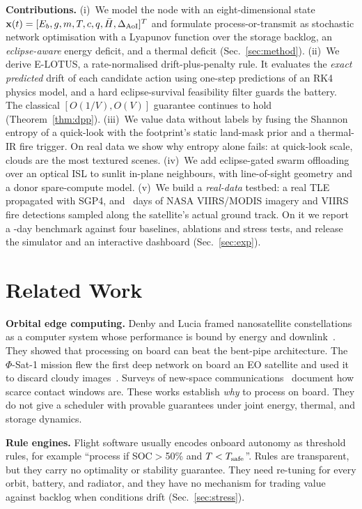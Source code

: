 \documentclass[conference]{IEEEtran}
\theoremstyle{remark}
\begin{document}
\textbf{Contributions.}
(i)~We model the node with an eight-dimensional state
$\mathbf{x}(t)=[E_b,g,m,T,c,q,\bar H,\Delta_{\rm AoI}]^T$
and formulate process-or-transmit as stochastic network optimisation with a Lyapunov function over the storage backlog, an \emph{eclipse-aware} energy deficit, and a thermal deficit (Sec.~\ref{sec:method}).
(ii)~We derive E-LOTUS, a rate-normalised drift-plus-penalty rule. It evaluates the \emph{exact predicted} drift of each candidate action using one-step predictions of an RK4 physics model, and a hard eclipse-survival feasibility filter guards the battery. The classical $[O(1/V),O(V)]$ guarantee continues to hold (Theorem~\ref{thm:dpp}).
(iii)~We value data without labels by fusing the Shannon entropy of a quick-look with the footprint's static land-mask prior and a thermal-IR fire trigger. On real data we show why entropy alone fails: at quick-look scale, clouds are the most textured scenes.
(iv)~We add eclipse-gated swarm offloading over an optical ISL to sunlit in-plane neighbours, with line-of-sight geometry and a donor spare-compute model.
(v)~We build a \emph{real-data} testbed: a real TLE propagated with SGP4, and \Days\ days of NASA VIIRS/MODIS imagery and VIIRS fire detections sampled along the satellite's actual ground track. On it we report a \Days-day benchmark against four baselines, ablations and stress tests, and release the simulator and an interactive dashboard (Sec.~\ref{sec:exp}).

\section{Related Work}
\textbf{Orbital edge computing.} Denby and Lucia framed nanosatellite constellations as a computer system whose performance is bound by energy and downlink~\cite{denby2020oec}. They showed that processing on board can beat the bent-pipe architecture. The $\Phi$-Sat-1 mission flew the first deep network on board an EO satellite and used it to discard cloudy images~\cite{giuffrida2022phisat}. Surveys of new-space communications~\cite{kodheli2021survey} document how scarce contact windows are. These works establish \emph{why} to process on board. They do not give a scheduler with provable guarantees under joint energy, thermal, and storage dynamics.

\textbf{Rule engines.} Flight software usually encodes onboard autonomy as threshold rules, for example ``process if SOC$>$50\% and $T<T_{\rm safe}$''. Rules are transparent, but they carry no optimality or stability guarantee. They need re-tuning for every orbit, battery, and radiator, and they have no mechanism for trading value against backlog when conditions drift (Sec.~\ref{sec:stress}).
\end{document}
